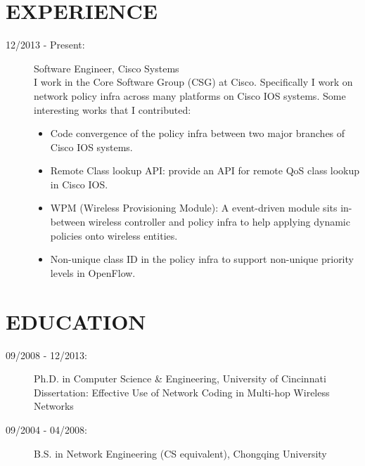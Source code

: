 \documentclass[line]{res}
\begin{document}
\address{36681 Bishop St \\ Newark, CA 94560 \\ 513-679-0772}
\address{Email: \href{mailto:yang@yangchi.me}{yang@yangchi.me} \\ Github: \url{https://github.com/yangchi} }

\begin{resume}
	\section{EXPERIENCE}
	\begin{description}
		\item[12/2013 - Present:] Software Engineer, Cisco Systems \\
		I work in the Core Software Group (CSG) at Cisco. Specifically I work on network policy infra across many platforms on Cisco IOS systems. Some interesting works that I contributed:
        \begin{itemize}
            \item Code convergence of the policy infra between two major branches of Cisco IOS systems.
			\item Remote Class lookup API: provide an API for remote QoS class lookup in Cisco IOS.
            \item WPM (Wireless Provisioning Module): A event-driven module sits in-between wireless controller and policy infra to help applying dynamic policies onto wireless entities.
			\item Non-unique class ID in the policy infra to support non-unique priority levels in OpenFlow.
		\end{itemize}
	\end{description}
	\section{EDUCATION}
	\begin{description}
		\item[09/2008 - 12/2013:] Ph.D. in Computer Science \& Engineering, University of Cincinnati\\
			Dissertation: Effective Use of Network Coding in Multi-hop Wireless Networks
		\item[09/2004 - 04/2008:] B.S. in Network Engineering (CS equivalent), Chongqing University
	\end{description}
	

\end{resume}
\end{document}

